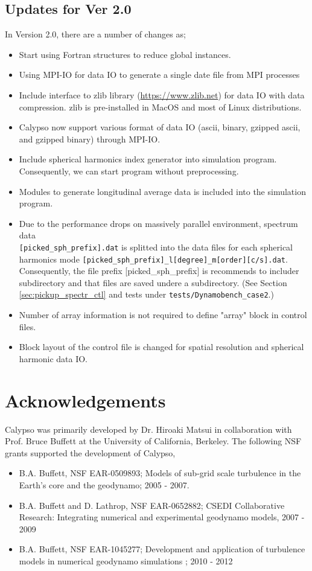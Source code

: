\subsection{Updates for Ver 2.0}
In Version 2.0, there are a number of changes as;
\begin{itemize}
\item Start using Fortran structures to reduce global instances.
\item Using MPI-IO for data IO to generate a single date file from MPI processes
\item Include interface to zlib library (\url{https://www.zlib.net}) for data IO with data compression. zlib is pre-installed in MacOS and most of Linux distributions.
\item Calypso now support various format of data IO (ascii, binary, gzipped ascii, and gzipped binary) through MPI-IO.
\item Include spherical harmonics index generator into simulation program. Consequently, we can start program without preprocessing.
\item Modules to generate longitudinal average data is included into the simulation program.
\item Due to the performance drops on massively parallel environment, spectrum data \\
{\tt [picked\_sph\_prefix].dat} is splitted into the data files for each spherical harmonics mode {\tt [picked\_sph\_prefix]\_l[degree]\_m[order][c/s].dat}. Consequently, the file prefix [picked\_sph\_prefix] is recommends to includer subdirectory and that files are saved undere a subdirectory. (See Section \ref{sec:pickup_spectr_ctl} and tests under \verb|tests/Dynamobench_case2|.)
\item Number of array information is not required to define "array" block in control files.
\item Block layout of the control file is changed for spatial resolution and spherical harmonic data IO.
\end{itemize}






\section{Acknowledgements}
\label{section:acknowledgements}
Calypso was primarily developed by Dr. Hiroaki Matsui in collaboration with Prof. Bruce Buffett at the University of California, Berkeley. The following NSF grants supported the development of Calypso, 
%
\begin{itemize}
\item B.A. Buffett, NSF EAR-0509893; Models of sub-grid scale turbulence in the Earth's core and the geodynamo; 2005 - 2007.
\item B.A. Buffett and D. Lathrop,  NSF EAR-0652882; CSEDI Collaborative Research: Integrating numerical and experimental geodynamo models, 2007 - 2009
\item B.A. Buffett, NSF EAR-1045277; Development and application of turbulence models in numerical geodynamo simulations ;  2010 - 2012
\end{itemize}
%

